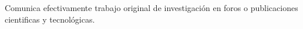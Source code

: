Comunica efectivamente trabajo original de investigaci\'{o}n en foros o publicaciones cientificas y tecnol\'{o}gicas.